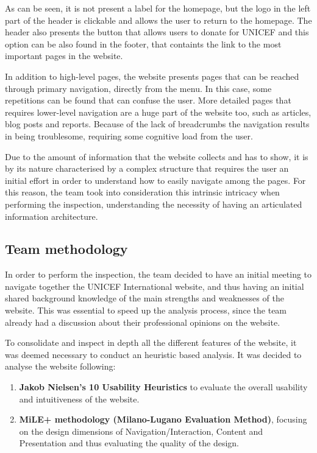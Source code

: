 As can be seen, it is not present a label for the homepage, but the logo in the left part of the header is clickable and allows the user to return to the homepage. The header also presents the button that allows users to donate for UNICEF and this option can be also found in the footer, that containts the link to the most important pages in the website.

In addition to high-level pages, the website presents pages that can be reached through primary navigation, directly from the menu. In this case, some repetitions can be found that can confuse the user.
More detailed pages that requires lower-level navigation are a huge part of the website too, such as articles, blog posts and reports. Because of the lack of breadcrumbs the navigation results in being troublesome, requiring some cognitive load from the user.

Due to the amount of information that the website collects and has to show, it is by its nature characterised by a complex structure that requires the user an initial effort in order to understand how to easily navigate among the pages. For this reason, the team took into consideration this intrinsic intricacy when performing the inspection, understanding the necessity of having an articulated information architecture.
\clearpage

\subsection{Team methodology}
In order to perform the inspection, the team decided to have an initial meeting to navigate together the UNICEF International website, and thus having an initial shared background knowledge of the main strengths and weaknesses of the website. 
This was essential to speed up the analysis process, since the team already had a discussion about their professional opinions on the website.

To consolidate and inspect in depth all the different features of the website, it was deemed necessary to conduct an heuristic based analysis.
It was decided to analyse the website following:
\begin{enumerate}
    \item \textbf{Jakob Nielsen's 10 Usability Heuristics} to evaluate the overall usability and intuitiveness of the website.
    \item \textbf{MiLE+ methodology (Milano-Lugano Evaluation Method)}, focusing on the design dimensions of Navigation/Interaction, Content and Presentation and thus evaluating the quality of the design.
\end{enumerate}


